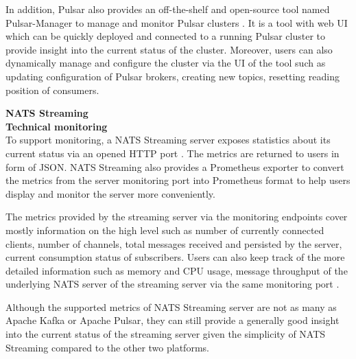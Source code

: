 In addition, Pulsar also provides an off-the-shelf and open-source tool named Pulsar-Manager to manage and monitor Pulsar clusters \cite{pulsarmanager}. It is a tool with web UI which can be quickly deployed and connected to a running Pulsar cluster to provide insight into the current status of the cluster. Moreover, users can also dynamically manage and configure the cluster via the UI of the tool such as updating configuration of Pulsar brokers, creating new topics, resetting reading position of consumers.

\large \textbf{NATS Streaming}\\
\normalsize
\textbf{Technical monitoring}\\
To support monitoring, a NATS Streaming server exposes statistics about its current status via an opened HTTP port \cite{natsmonitoring}. The metrics are returned to users in form of JSON. NATS Streaming also provides a Prometheus exporter to convert the metrics from the server monitoring port into Prometheus format to help users display and monitor the server more conveniently. 

The metrics provided by the streaming server via the monitoring endpoints cover mostly information on the high level such as number of currently connected clients, number of channels, total messages received and persisted by the server, current consumption status of subscribers. Users can also keep track of the more detailed information such as memory and CPU usage, message throughput of the underlying NATS server of the streaming server via the same monitoring port \cite{natsmonitoring1}. 

Although the supported metrics of NATS Streaming server are not as many as Apache Kafka or Apache Pulsar, they can still provide a generally good insight into the current status of the streaming server given the simplicity of NATS Streaming compared to the other two platforms.

